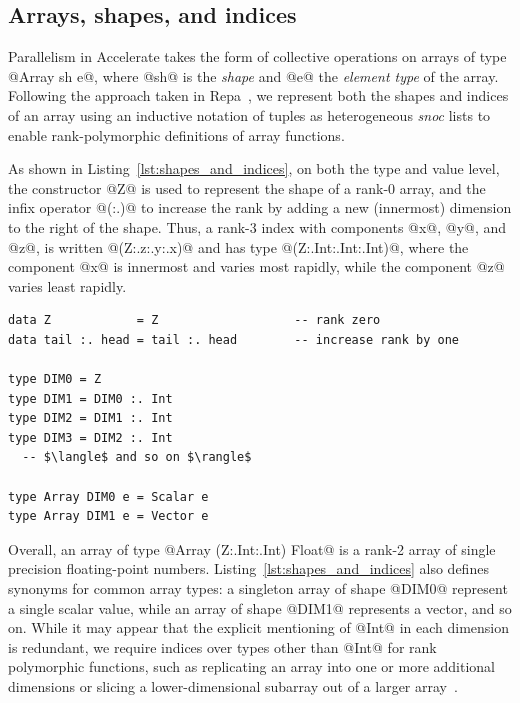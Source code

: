 \subsection{Arrays, shapes, and indices}
\label{sec:arrays_shapes_and_indices}

Parallelism in Accelerate takes the form of collective operations on arrays of
type @Array sh e@, where @sh@ is the \emph{shape} and @e@ the \emph{element
type} of the array. Following the approach taken in Repa~\cite{Keller:2010er},
we represent both the shapes and indices of an array using an inductive notation
of tuples as heterogeneous \emph{snoc} lists to enable rank-polymorphic
definitions of array functions.

As shown in Listing~\ref{lst:shapes_and_indices}, on both the type and value
level, the constructor @Z@ is used to represent the shape of a rank-0 array, and
the infix operator @(:.)@ to increase the rank by adding a new (innermost)
dimension to the right of the shape. Thus, a rank-3 index with components @x@,
@y@, and @z@, is written @(Z:.z:.y:.x)@ and has type @(Z:.Int:.Int:.Int)@, where
the component @x@ is innermost and varies most rapidly, while the component @z@
varies least rapidly.

\begin{lstlisting}[style=haskell
    ,float
    ,label=lst:shapes_and_indices
    ,caption={Types of array shapes and indices}]
data Z            = Z                   -- rank zero
data tail :. head = tail :. head        -- increase rank by one

type DIM0 = Z
type DIM1 = DIM0 :. Int
type DIM2 = DIM1 :. Int
type DIM3 = DIM2 :. Int
  -- $\langle$ and so on $\rangle$

type Array DIM0 e = Scalar e
type Array DIM1 e = Vector e
\end{lstlisting}

Overall, an array of type @Array (Z:.Int:.Int) Float@ is a rank-2 array of
single precision floating-point numbers. Listing~\ref{lst:shapes_and_indices}
also defines synonyms for common array types: a singleton array of shape @DIM0@
represent a single scalar value, while an array of shape @DIM1@ represents a
vector, and so on. While it may appear that the explicit mentioning of @Int@ in
each dimension is redundant, we require indices over types other than @Int@ for
rank polymorphic functions, such as replicating an array into one or more
additional dimensions or slicing a lower-dimensional subarray out of a larger
array~\cite{Keller:2010er}.


